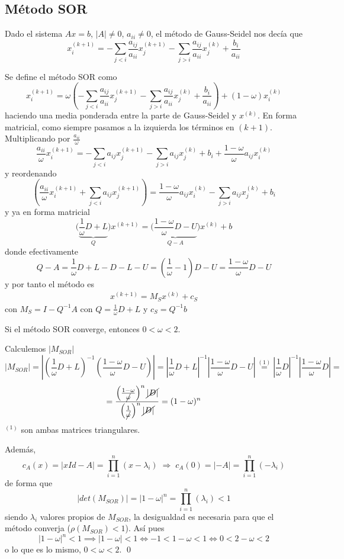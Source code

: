     \subsection{Método SOR}
    Dado el sistema $Ax=b$, $|A|\neq 0$, $a_{ii} \neq 0$, el método de Gauss-Seidel nos decía que
    $$x_i^{(k+1)}=-\sum_{j<i} \dfrac{a_{ij}}{a_{ii}} x_j^{(k+1)} - \sum_{j>i} \dfrac{a_{ij}}{a_{ii}} x_j^{(k)} + \dfrac{b_i}{a_{ii}}$$
    \begin{met}
         Se define el método SOR como 
        $$\; x_i^{(k+1)}=\omega\left(-\sum_{j<i} \dfrac{a_{ij}}{a_{ii}} x_j^{(k+1)} - \sum_{j>i} \dfrac{a_{ij}}{a_{ii}} x_j^{(k)} + \dfrac{b_i}{a_{ii}} \right)+(1-\omega) x_i^{(k)} \; $$
        haciendo una media ponderada entre la parte de Gauss-Seidel y $x^{(k)}$. En forma matricial, como siempre pasamos a la izquierda los términos en $(k+1)$. Multiplicando por $\frac{a_{ii}}{\omega}$
        $$\dfrac{a_{ii}}{\omega}x_i^{(k+1)}=-\sum_{j<i} a_{ij} x_j^{(k+1)} - \sum_{j>i} a_{ij} x_j^{(k)} + b_i+\dfrac{1-\omega}{\omega} a_{ij} x_i^{(k)}$$
        y reordenando
        $$\left(\dfrac{a_{ii}}{\omega}x_i^{(k+1)} +  \sum_{j<i} a_{ij} x_j^{(k+1)} \right)=\dfrac{1-\omega}{\omega} a_{ij} x_i^{(k)} - \sum_{j>i} a_{ij} x_j^{(k)} + b_i$$
        y ya en forma matricial
        $$\biggl(\underbrace{\dfrac{1}{\omega} D + L}_{Q}\biggr)x^{(k+1)} = \biggl(\underbrace{\dfrac{1-\omega}{\omega} D -U}_{Q-A}\biggr)x^{(k)} + b $$
        donde efectivamente
        $$Q-A=\dfrac{1}{\omega} D + L - D - L -U = \left(\frac{1}{\omega}-1\right) D - U =\dfrac{1-\omega}{\omega} D -U$$
        y por tanto el método es 
        \begin{align}
         x^{(k+1)}=M_{S}x^{(k)} +c_S 
         \label{met:sor}
        \end{align}
        con $M_S=I-Q^{-1}A$ con $Q=\frac{1}{\omega} D + L$ y $c_S=Q^{-1}b$
    \end{met}
    \begin{teo}
        Si el método SOR converge, entonces $0 < \omega < 2$.
    \end{teo}
    \begin{dem}
        Calculemos $|M_{SOR}|$
        $$|M_{SOR}|=\left|\left(\dfrac{1}{\omega} D +L\right)^{-1}\left(\dfrac{1-\omega}{\omega} D -U\right)\right|=\left|\dfrac{1}{\omega} D +L\right|^{-1} \left|\dfrac{1-\omega}{\omega} D -U \right|\overset{(1)}{=}\left| \dfrac{1}{\omega} D\right|^{-1}\left| \dfrac{1-\omega}{\omega} D\right|=$$
        $$=\dfrac{\left(\frac{1-\omega}{\cancel{\omega}}\right)^n \cancel{|D|}}{\left(\frac{1}{\cancel{\omega}}\right)^n \cancel{|D|}}=(1-\omega)^n$$
        $^{(1)}$ son ambas matrices triangulares.
        
        Además, 
        $$c_A(x)=|xId-A|=\prod_{i=1}^n (x-\lambda_i) \; \Rightarrow \; c_A(0)=|-A|=\prod_{i=1}^n (-\lambda_i)$$
        de forma que 
        $$|det(M_{SOR})|=|1-\omega|^n=\prod_{i=1}^n (\lambda_i) < 1$$
        siendo $\lambda_i$ valores propios de $M_{SOR}$, la desigualdad es necesaria para que el método converja ($\rho(M_{SOR})< 1$). Así pues
        $$|1-\omega|^n < 1 \implies |1-\omega| < 1 \iff -1<1-\omega < 1 \iff 0 < 2 -\omega <2 $$
        o lo que es lo mismo, $0 < \omega < 2$.
    \qed\end{dem}
